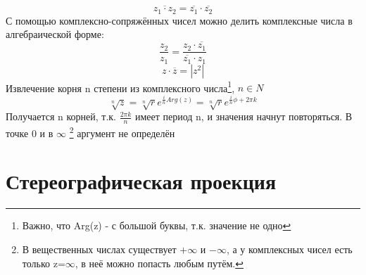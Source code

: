 \documentclass{article}
\begin{document}
            \begin{equation}\label{complex_conjugate}
               \overline{z_{1} \cdot z_{2}}=\overline{z_{1}} \cdot \overline{z_{2}}              
            \end{equation}
            С помощью комплексно-сопряжённых чисел можно делить комплексные числа в алгебраической форме:
            \begin{equation}
               \frac{ z_{2} }{ z_{1} } = \frac{ z_{2} \cdot \overline{ z_{1} }}{ \overline{z_{1}} \cdot z_{1} }
            \end{equation}
            \begin{equation}
               z \cdot \overline{z}=|z^{2}|
            \end{equation}
          Извлечение корня n степени из комплексного числа\footnote{Важно, что Arg(z) - с большой буквы, т.к. значение не одно}, $n \in N $
            \begin{equation}
              \sqrt[n]{z}=\sqrt[n]{r} e^{\frac{i}{n} Arg(z)}=\sqrt[n]{r} e^{\frac{i}{n} \phi + 2 \pi k}
            \end{equation}
          Получается n корней, т.к. $\frac{2 \pi k}{n}$ имеет период n, и значения начнут повторяться. В точке 0 и в $\infty$ \footnote{
              В вещественных числах существует $+ \infty$ и $- \infty$, а у комплексных чисел есть только z=$\infty$, в неё можно попасть любым путём.
            } аргумент не определён
            \newpage
        \section{Стереографическая проекция}
\end{document}
